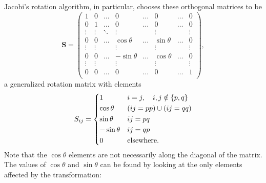 \documentclass[aps,prc,reprint,nobalancelastpage]{revtex4-1}
\begin{document}
        Jacobi's rotation algorithm, in particular, chooses these orthogonal matrices to be
        \begin{equation}
            \mathbf{S} = \begin{pmatrix}
                1      & 0      & \dots  & 0           & \dots &  0         & \dots & 0\\
                0      & 1      & \dots  & 0           & \dots &  0         & \dots & 0\\
                \vdots & \vdots & \ddots & \vdots      &       & \vdots     &       & \vdots \\
                0      & 0      & \dots  & \cos\theta  & \dots & \sin\theta & \dots & 0\\
                \vdots & \vdots &        & \vdots      &       & \vdots     &       & \vdots \\
                0      & 0      & \dots  & -\sin\theta & \dots & \cos\theta & \dots & 0 \\
                \vdots & \vdots &        & \vdots      &       & \vdots     &       & \vdots \\
                0      & 0      & \dots  & 0           & \dots & 0          & \dots & 1 \\

            \end{pmatrix},
        \end{equation}
        a generalized rotation matrix with elements
        \begin{equation*}
            S_{ij} = \begin{dcases}
                1           & i=j,\quad i,j \notin \{p,q\}  \\
                \cos\theta  & (ij=pp) \cup (ij=qq) \\
                \sin\theta  & ij=pq \\
                -\sin\theta & ij=qp \\
                0           & \text{elsewhere}.
            \end{dcases}
        \end{equation*}
        Note that the $\cos\theta$ elements are not necessarily along the diagonal of the matrix. The values of $\cos\theta$ and $\sin\theta$ can be found by looking at the only elements affected by the transformation:
\end{document}
